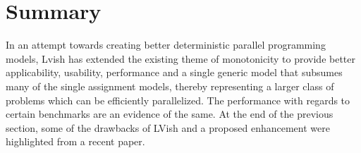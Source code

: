 \documentclass[twocolumn]{article}
\begin{document}
\section{Summary}
\label{summary}
In an attempt towards creating better deterministic parallel programming models, Lvish has extended the existing theme of monotonicity to provide better applicability, usability, performance and a single generic model that subsumes many of the single assignment models, thereby representing a larger class of problems which can be efficiently parallelized. The performance with regards to certain benchmarks are an evidence of the same. At the end of the previous section, some of the drawbacks of LVish and a proposed enhancement were highlighted from a recent paper.

 
\end{document}
